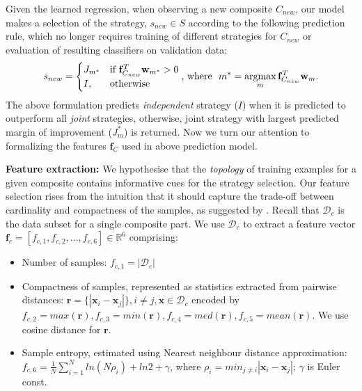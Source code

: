 \documentclass[runningheads]{llncs}
\begin{document}
Given the learned regression, when observing a new composite $C_{new}$, our model makes a selection of the strategy, $s_{new} \in S$ according to the following prediction rule, which no longer requires training of different strategies for $C_{new}$ or evaluation of resulting classifiers on validation data:
%
\begin{equation}
\begin{align}
s_{new}= 
\begin{cases}
    J_{m^*}& \text{if } \mathbf{f}_{C_{new}}^{T} \mathbf{w}_{m^{*}} > 0\\
    I,              & \text{otherwise}
\end{cases}
\text{, where~~} 
m^* = \operatornamewithlimits{argmax}_{m} \mathbf{f}_{C_{new}}^{T}\mathbf{w}_m.
\end{align}
\end{equation}
%
The above formulation predicts {\em independent} strategy ($I$) when it is predicted to outperform all {\em joint} strategies, otherwise, joint strategy with largest predicted margin of improvement ($J_m^*$) is returned. Now we turn our attention to formalizing the features $\mathbf{f}_C$ used in above prediction model.


\vspace{0.1in}
\noindent
{\bf Feature extraction:}
We hypothesise that the {\em topology} of training examples for a given composite contains informative cues for the strategy selection. Our feature selection rises from the intuition that it should capture the trade-off between cardinality and compactness of the samples, as suggested by \cite{Rastegari2013}. Recall that $\mathcal{D}_c$ is the data subset for a single composite part. We use $\mathcal{D}_c$ to extract a feature vector $\mathbf{f}_c = [f_{c,1}, f_{c,2}, ..., f_{c,6}] \in \mathbb{R}^{6}$ comprising:
\begin{itemize}
\item Number of samples: $f_{c,1} = |\mathcal{D}_c|$
\item Compactness of samples, represented as statistics extracted from pairwise distances:
$\mathbf r=\{|\mathbf x_i-\mathbf x_j|\},i \neq j,\mathbf x \in \mathcal{D}_c$ encoded by 
$f_{c,2}=max(\mathbf r), f_{c,3}=min(\mathbf r), f_{c,4}=med(\mathbf r), f_{c,5}=mean(\mathbf r)$. 
We use cosine distance for $\mathbf{r}$. 
\item Sample entropy, estimated using Nearest neighbour distance approximation:
$f_{c,6}=\frac{1}{N}\sum\limits_{i=1}^N ln(N\rho_i) + ln2 + \gamma$, where $\rho_i = min_{j\neq i} |\mathbf x_i-\mathbf x_j|$; $\gamma$ is Euler const. 
\end{itemize}
\end{document}
